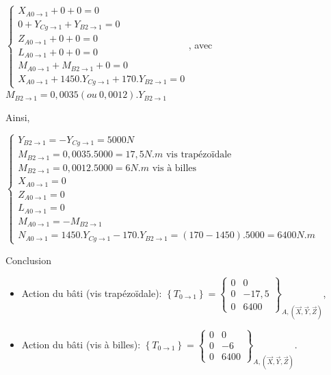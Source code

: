 $\left\{\begin{array}{l}
X_{A0\rightarrow 1}+0+0=0 \\
0+Y_{Cg\rightarrow 1}+Y_{B2\rightarrow 1}=0 \\
Z_{A0\rightarrow 1}+0+0=0 \\
L_{A0\rightarrow 1}+0+0=0 \\
M_{A0\rightarrow 1}+M_{B2\rightarrow 1}+0=0 \\
X_{A0\rightarrow 1}+1450.Y_{Cg\rightarrow 1}+170.Y_{B2\rightarrow 1}=0
\end{array}\right.$, avec $M_{B2\rightarrow 1}=0,0035(ou\ 0,0012).Y_{B2\rightarrow 1}$


Ainsi,

$\left\{\begin{array}{l}
Y_{B2\rightarrow 1}=-Y_{Cg\rightarrow 1}=5000N \\
M_{B2\rightarrow 1}=0,0035.5000=17,5N.m \text{ vis trapézoïdale}\\
M_{B2\rightarrow 1}=0,0012.5000=6N.m \text{ vis à billes}\\
X_{A0\rightarrow 1}=0 \\
Z_{A0\rightarrow 1}=0 \\
L_{A0\rightarrow 1}=0 \\
M_{A0\rightarrow 1}=-M_{B2\rightarrow 1} \\
N_{A0\rightarrow 1}=1450.Y_{Cg\rightarrow 1}-170.Y_{B2\rightarrow 1}=(170-1450).5000=6400N.m
\end{array}\right.$

Conclusion
\begin{itemize}
  \item Action du bâti (vis trapézoïdale): $\left\{T_{0\rightarrow 1}\right\}=\left\{\begin{array}{cc}0 & 0 \\ 0 & -17,5 \\ 0 & 6400\end{array}\right\}_{A	,(\overrightarrow{X},\overrightarrow{Y},\overrightarrow{Z})}$,
  \item Action du bâti (vis à billes): $\left\{T_{0\rightarrow 1}\right\}=\left\{\begin{array}{cc}0 & 0 \\ 0 & -6 \\ 0 & 6400\end{array}\right\}_{A	,(\overrightarrow{X},\overrightarrow{Y},\overrightarrow{Z})}$.
 \end{itemize}
 
